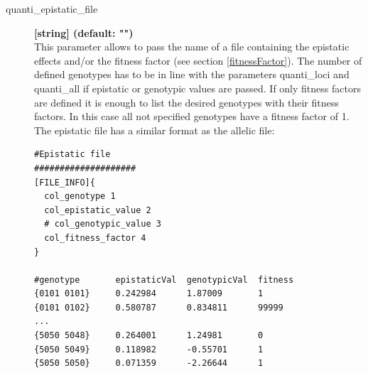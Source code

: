 \documentclass[letterpaper,12pt,oneside]{book}
\begin{document}
\begin{description}
\item[quanti\_epistatic\_file] \textbf{[string] (default: "")}\\
This parameter allows to pass the name of a file containing the epistatic effects and/or the fitness factor (see section \ref{fitnessFactor}). The number of defined genotypes has to be in line with the parameters \textsf{quanti\_loci} and \textsf{quanti\_all} if epistatic or genotypic values are passed. If only fitness factors are defined it is enough to list the desired genotypes with their fitness factors. In this case all not specified genotypes have a fitness factor of 1. The epistatic file has a similar format as the allelic file:

\begin{lstlisting}[frame=single]
#Epistatic file 
####################
[FILE_INFO]{
  col_genotype 1
  col_epistatic_value 2
  # col_genotypic_value 3
  col_fitness_factor 4
}

#genotype       epistaticVal  genotypicVal  fitness
{0101 0101}     0.242984      1.87009       1    
{0101 0102}     0.580787      0.834811      99999   
...
{5050 5048}     0.264001      1.24981       0
{5050 5049}     0.118982      -0.55701      1
{5050 5050}     0.071359      -2.26644      1
\end{lstlisting}


\end{description}
\end{document}
